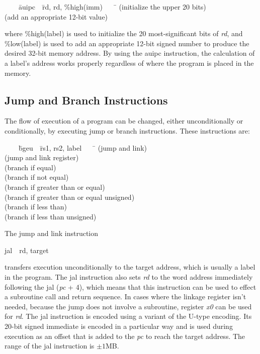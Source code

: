 \documentclass[11pt, twoside, pdftex]{article}
\newenvironment{ctabbing}%
{\begin{center}\begin{minipage}{\textwidth}\begin{tabbing}}
{\end{tabbing}\end{minipage}\end{center}}
\begin{document}
\begin{ctabbing}
~~~~\={\sf auipc}~~\={\sf rd, rd, \%high(imm)}~~~~\=\kill
{}  \>(initialize the upper 20 bits)\\
  \>(add an appropriate 12-bit value)\\
\end{ctabbing}
\vspace{-\baselineskip}
where {\sf \%high(label)} is used to initialize the 20 most-significant bits of {\it rd}, and 
{\sf \%low(label)} is used to add an appropriate 12-bit signed number to produce the desired 
32-bit memory address. By using the {\sf auipc} instruction, the calculation of a label's
address works properly regardless of where the program is placed in the memory.

\subsection{Jump and Branch Instructions}
\label{sec:flow}

The flow of execution of a program can be changed, either unconditionally or
conditionally, by executing jump or branch instructions.  These instructions are:

\begin{ctabbing}
~~~~\={\sf bgeu}~~\={\sf rs1, rs2, label}~~~~\=\kill
{}  \>(jump and link)\\
  \>(jump and link register)\\
  \>(branch if equal)\\
  \>(branch if not equal)\\
  \>(branch if greater than or equal)\\
  \>(branch if greater than or equal unsigned)\\
  \>(branch if less than)\\
  \>(branch if less than unsigned)
\end{ctabbing}
\noindent
The jump and link instruction
\vspace{-\baselineskip}
\begin{center}
{\sf jal~~rd, target}
\end{center}
\noindent
transfers execution unconditionally to the target address, which is usually a label in the
program. The {\sf jal} instruction also sets {\it rd} to the
word address immediately following the {\sf jal} ({\it pc} + 4), which means that this 
instruction can be used to effect a subroutine call and return sequence. In cases where the 
linkage register isn't needed, because the jump does not involve a subroutine, register {\it x0} 
can be used for {\it rd}. The {\sf jal} instruction is encoded using a variant of 
the U-type encoding. Its 20-bit signed immediate is encoded in a particular way and is used 
during execution as an offset that is added to the {\it pc} to reach the target address.
The range of the {\sf jal} instruction is $\pm 1$MB.
 
\end{document}
